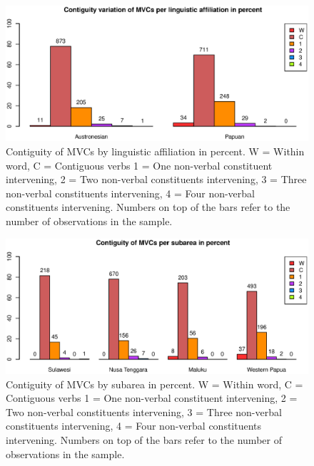 \begin{figure}
\includegraphics[width=\columnwidth]{figures/Contiguity_Family.eps}
\caption[Contiguity of MVCs by linguistic affiliation]{Contiguity of MVCs by linguistic affiliation in percent. W = Within word, C = Contiguous verbs 1 = One non-verbal constituent intervening, 2 = Two non-verbal constituents intervening, 3 = Three non-verbal constituents intervening, 4 = Four non-verbal constituents intervening. Numbers on top of the bars refer to the number of observations in the sample.}\label{fig:adj-family}
\end{figure}
\begin{figure}
\includegraphics[width=\columnwidth]{figures/Contiguity_Group.eps}
\caption[Contiguity of MVCs by subarea]{Contiguity of MVCs by subarea in percent. W = Within word, C = Contiguous verbs 1 = One non-verbal constituent intervening, 2 = Two non-verbal constituents intervening, 3 = Three non-verbal constituents intervening, 4 = Four non-verbal constituents intervening. Numbers on top of the bars refer to the number of observations in the sample.}\label{fig:adj-group}
\end{figure}

